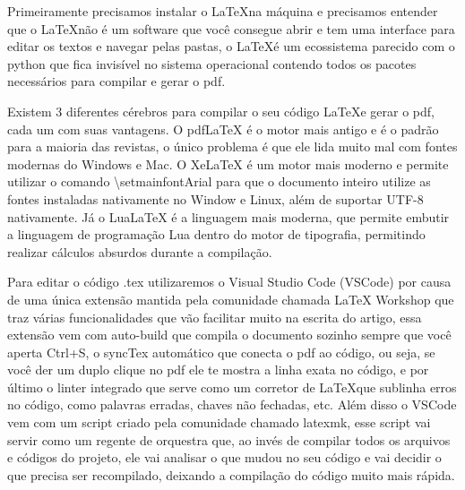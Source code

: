 Primeiramente precisamos instalar o \LaTeX na máquina e precisamos entender que o \LaTeX não é um software que você consegue abrir e tem uma interface para editar os textos e navegar pelas pastas, o \LaTeX é um ecossistema parecido com o python que fica invisível no sistema operacional contendo todos os pacotes necessários para compilar e gerar o pdf.

Existem 3 diferentes cérebros para compilar o seu código \LaTeX e gerar o pdf, cada um com suas vantagens. O pdfLaTeX é o motor mais antigo e é o padrão para a maioria das revistas, o único problema é que ele lida muito mal com fontes modernas do Windows e Mac. O XeLaTeX é um motor mais moderno e permite utilizar o comando \textbackslash setmainfontArial para que o documento inteiro utilize as fontes instaladas nativamente no Window e Linux, além de suportar UTF-8 nativamente. Já o LuaLaTeX é a linguagem mais moderna, que permite embutir a linguagem de programação Lua dentro do motor de tipografia, permitindo realizar cálculos absurdos durante a compilação.

Para editar o código .tex utilizaremos o Visual Studio Code (VSCode) por causa de uma única extensão mantida pela comunidade chamada LaTeX Workshop que traz várias funcionalidades que vão facilitar muito na escrita do artigo, essa extensão vem com auto-build que compila o documento sozinho sempre que você aperta Ctrl+S, o syncTex automático que conecta o pdf ao código, ou seja, se você der um duplo clique no pdf ele te mostra a linha exata no código, e por último o linter integrado que serve como um corretor de \LaTeX que sublinha erros no código, como palavras erradas, chaves não fechadas, etc. Além disso o VSCode vem com um script criado pela comunidade chamado latexmk, esse script vai servir como um regente de orquestra que, ao invés de compilar todos os arquivos e códigos do projeto, ele vai analisar o que mudou no seu código e vai decidir o que precisa ser recompilado, deixando a compilação do código muito mais rápida.

